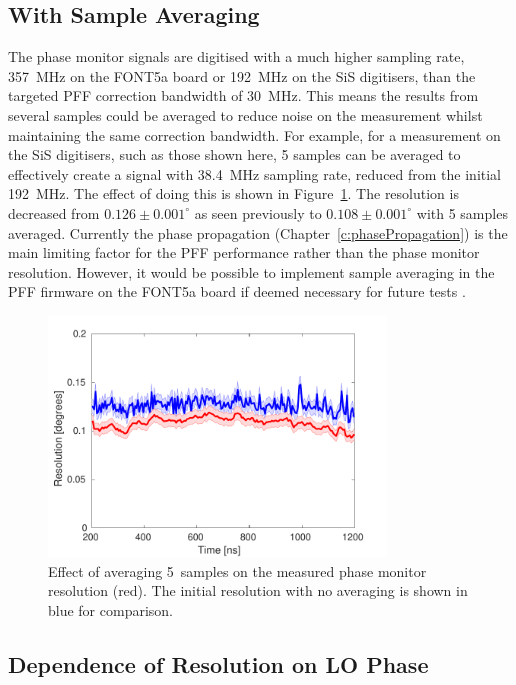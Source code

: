 \subsection{With Sample Averaging}
\label{ss:resSampAvg}

The phase monitor signals are digitised with a much higher sampling rate, 357~MHz on the FONT5a board or 192~MHz on the SiS digitisers, than the targeted PFF correction bandwidth of 30~MHz. This means the results from several samples could be averaged to reduce noise on the measurement whilst maintaining the same correction bandwidth. For example, for a measurement on the SiS digitisers, such as those shown here, 5 samples can be averaged to effectively create a signal with 38.4~MHz sampling rate, reduced from the initial 192~MHz. The effect of doing this is shown in Figure~\ref{f:resolutionWithAveraging}. The resolution is decreased from \(0.126\pm0.001^\circ\) as seen previously to \(0.108\pm0.001^\circ\) with 5 samples averaged. Currently the phase propagation (Chapter~\ref{c:phasePropagation}) is the main limiting factor for the PFF performance rather than the phase monitor resolution. However, it would be possible to implement sample averaging in the PFF firmware on the FONT5a board if deemed necessary for future tests \cite{glennPriv}.

\begin{figure}
  \centering
  \includegraphics[width=0.8\textwidth]{Figures/phaseMons/resolutionWithAveraging}
  \caption{Effect of averaging 5~samples on the measured phase monitor resolution (red). The initial resolution with no averaging is shown in blue for comparison.}
  \label{f:resolutionWithAveraging}
\end{figure}


\subsection{Dependence of Resolution on LO Phase}
\label{ss:resVsShifter}

